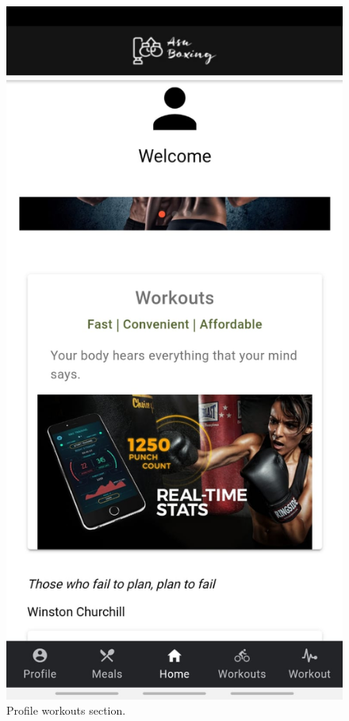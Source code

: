 \documentclass[a4paper,12pt]{report}
\begin{document}
\begin{figure}[ht]
\begin{minipage}[b]{0.5\linewidth}
    \includegraphics[width=.7\linewidth]{images/aplicationImages/homePageTop.jpeg} 
    \caption{Profile workouts section.} 
    \vspace{4ex}
  \end{minipage} 
  \begin{center}
  \begin{minipage}[b]{0.5\linewidth}
    \centering

\end{minipage}
\end{center}
\end{figure}
\end{document}
